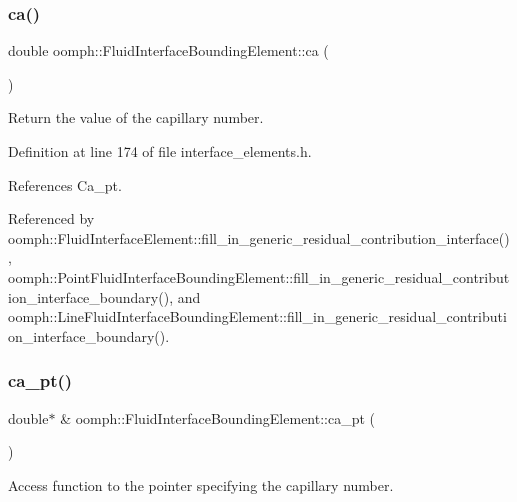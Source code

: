 \subsubsection{\texorpdfstring{ca()}{ca()}}
{\footnotesize\ttfamily double oomph\+::\+Fluid\+Interface\+Bounding\+Element\+::ca (\begin{DoxyParamCaption}{ }\end{DoxyParamCaption})\hspace{0.3cm}{\ttfamily [inline]}}



Return the value of the capillary number. 



Definition at line 174 of file interface\+\_\+elements.\+h.



References Ca\+\_\+pt.



Referenced by oomph\+::\+Fluid\+Interface\+Element\+::fill\+\_\+in\+\_\+generic\+\_\+residual\+\_\+contribution\+\_\+interface(), oomph\+::\+Point\+Fluid\+Interface\+Bounding\+Element\+::fill\+\_\+in\+\_\+generic\+\_\+residual\+\_\+contribution\+\_\+interface\+\_\+boundary(), and oomph\+::\+Line\+Fluid\+Interface\+Bounding\+Element\+::fill\+\_\+in\+\_\+generic\+\_\+residual\+\_\+contribution\+\_\+interface\+\_\+boundary().

\mbox{\label{classoomph_1_1FluidInterfaceBoundingElement_acf132633ea7ed6b063c1f2a0a62d0b8c}} 
\subsubsection{\texorpdfstring{ca\+\_\+pt()}{ca\_pt()}}
{\footnotesize\ttfamily double$\ast$ \& oomph\+::\+Fluid\+Interface\+Bounding\+Element\+::ca\+\_\+pt (\begin{DoxyParamCaption}{ }\end{DoxyParamCaption})\hspace{0.3cm}{\ttfamily [inline]}}



Access function to the pointer specifying the capillary number. 



